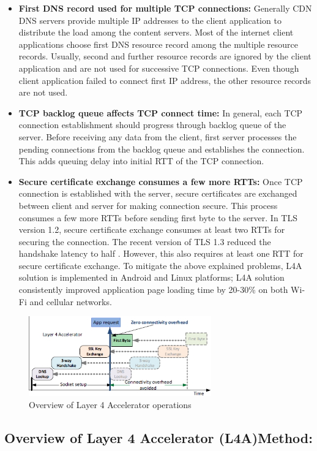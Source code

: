 \begin{multicols}{2}
\begin{itemize}
\item{\bf First DNS record used for multiple TCP connections:} Generally CDN DNS servers provide multiple IP addresses to the client application to distribute the load among the content servers. Most of the internet client applications choose first DNS resource record among the multiple resource records. Usually, second and further resource records are ignored by the client application and are not used for successive TCP connections. Even though client application failed to connect first IP address, the other resource records are not used.
\item{\bf TCP backlog queue affects TCP connect time:} In general, each TCP connection establishment should progress through backlog queue of the server. Before receiving any data from the client, first server processes the pending connections from the backlog queue and establishes the connection. This adds queuing delay into initial RTT of the TCP connection.
\item{\bf Secure certificate exchange consumes a few more RTTs:} Once TCP connection is established with the server, secure certificates are exchanged between client and server for making connection secure. This process consumes a few more RTTs before sending first byte to the server. In TLS version 1.2, secure certificate exchange consumes at least two RTTs for securing the connection. The recent version of TLS 1.3 reduced the handshake latency to half \cite{art1-key17}. However, this also requires at least one RTT for secure certificate exchange. To mitigate the above explained problems, L4A solution is implemented in Android and Linux platforms; L4A solution consistently improved application page loading time by 20-30\% on both Wi-Fi and cellular networks.
\end{itemize}

\begin{figure}[H]
\centering
\includegraphics[scale=0.8]{src/Figures/chap1/chap1-fig06.jpg}
\caption{Overview of Layer 4 Accelerator operations}\label{chap1-fig06}
\end{figure}

\subsection{Overview of Layer 4 Accelerator (L4A)Method:}


\end{multicols}
